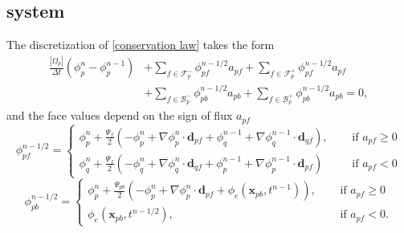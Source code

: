 \documentclass{article}
\begin{document}
\subsection{system}
The discretization of \eqref{conservation law} takes the form
\begin{align}
	\nonumber
	\frac{|\Omega_p|}{\Delta t}(\phi_p^{n} - \phi_p^{n-1})
	&+ \sum_{f \in \mathcal{F}_p^-}
	\phi_{pf}^{n-1/2} a_{pf} + \sum_{f \in \mathcal{F}_p^+} \phi_{pf}^{n-1/2} a_{pf}\\
	&+ \sum_{f \in \mathcal{B}_p^-}
	\phi_{pb}^{n-1/2} a_{pb} + \sum_{f \in \mathcal{B}_p^+} \phi_{pb}^{n-1/2} a_{pb} = 0,
\end{align}
and the face values depend on the sign of flux $ a_{pf} $
\[
	\phi_{pf}^{n-1/2} =
	\begin{cases}
		\phi_p^n +
		\frac{\Psi_{f}}{2}(-\phi_p^n + \nabla\phi_p^n\cdot\boldsymbol{d}_{pf} +
		\phi_q^{n-1} + \nabla\phi_q^{n-1}\cdot\boldsymbol{d}_{qf}),\quad
		&\text{ if } a_{pf} \geq 0 \\
		\phi_q^{n} +
		\frac{\Psi_{f}}{2}(-\phi_q^{n} + \nabla\phi_q^{n}\cdot\boldsymbol{d}_{qf} +
		\phi_p^{n-1} + \nabla\phi_p^{n-1}\cdot\boldsymbol{d}_{pf}) \quad
		&\text{ if } a_{pf} < 0
	\end{cases}
\]
\[
	\phi_{pb}^{n-1/2} =
	\begin{cases}
		\phi_p^n +
		\frac{\Psi_{pb}}{2}\left(-\phi_p^n + \nabla\phi_p^n\cdot\boldsymbol{d}_{pf} +
		\phi_e(\boldsymbol{x}_{pb}, t^{n-1})\right), \quad
		&\text{ if } a_{pf}
		\geq 0 \\
		\phi_e(\boldsymbol{x}_{pb}, t^{n-1/2}),\quad
		&\text{ if } a_{pf} < 0.
	\end{cases}
\]
\end{document}
